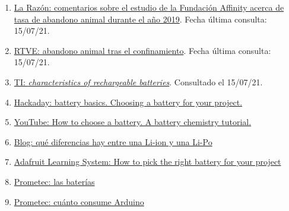 \documentclass[12pt]{article}
\begin{document}
\begin{enumerate}
			\item
			\label{bib: enlace La Razón} \href{https://www.larazon.es/medio-ambiente/20201118/qxv6yuokargfbnjvknn6bhm4ze.html}{La Razón: comentarios sobre el estudio de la Fundación Affinity acerca de tasa de abandono animal durante el año 2019}. Fecha última consulta: 15/07/21.
			
			\item
			\label{bib: enlace RTVE} \href{https://www.rtve.es/noticias/20200608/abandonos-animales-domesticos-se-han-disparado-espana-durante-meses-confinamiento/2015761.shtml}{RTVE: abandono animal tras el confinamiento}. Fecha última consulta: 15/07/21.
			
			\item
			\label{bib: TI rechargeable batteries}
			\href{https://www.ti.com/lit/an/snva533/snva533.pdf}{TI: \textit{characteristics of rechargeable batteries}}. Consultado el 15/07/21.
			
			\item 
			\label{bib: Hackaday battery basics}
			\href{https://hackaday.com/2014/12/16/battery-basics-choosing-a-battery-for-your-project/}{Hackaday: battery basics. Choosing a battery for your project.}

			\item 
			\label{bib: YouTube How to choose  a battery}
			\href{https://www.youtube.com/watch?v=saxYilLJ7yw}{YouTube: How to choose a battery. A battery chemistry tutorial.}
			
			\item 
			\label{bib: blog diferencias li-ion y li-po}
			\href{https://blog.330ohms.com/2020/06/22/que-diferencias-hay-entre-una-li-po-y-una-li-ion/}{Blog: qué diferencias hay entre una Li-ion y una Li-Po}
			
			\item 
			\label{bib: adafruit pick the right battery}
			\href{https://learn.adafruit.com/all-about-batteries/how-to-pick-the-right-battery-for-your-project}{Adafruit Learning System: How to pick the right battery for your project}
			
			\item 
			\label{bib: prometec baterías para proyectos con arduino}
			\href{https://www.prometec.net/arduino-baterias/}{Prometec: las baterías}
			
			\item 
			\label{bib: prometec consumo Arduino}
			\href{https://www.prometec.net/consumos-arduino/}{Prometec: cuánto consume Arduino}
			

\end{enumerate}
\end{document}
